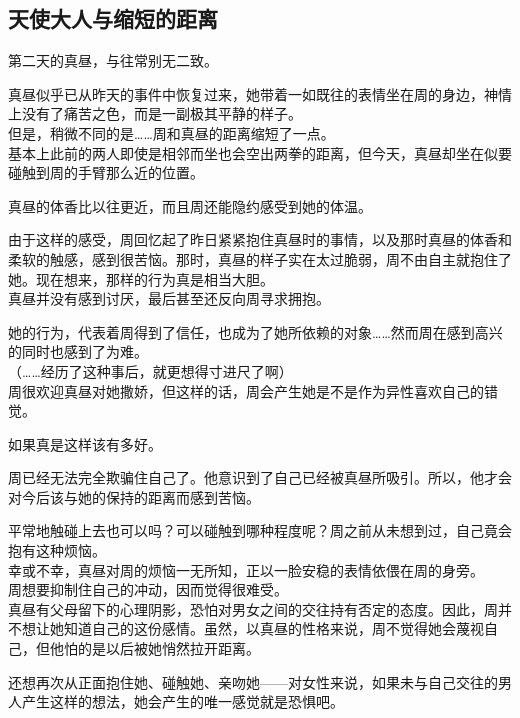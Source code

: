 \subsection{天使大人与缩短的距离}

第二天的真昼，与往常别无二致。

真昼似乎已从昨天的事件中恢复过来，她带着一如既往的表情坐在周的身边，神情上没有了痛苦之色，而是一副极其平静的样子。\\

但是，稍微不同的是……周和真昼的距离缩短了一点。\\

基本上此前的两人即使是相邻而坐也会空出两拳的距离，但今天，真昼却坐在似要碰触到周的手臂那么近的位置。

真昼的体香比以往更近，而且周还能隐约感受到她的体温。

由于这样的感受，周回忆起了昨日紧紧抱住真昼时的事情，以及那时真昼的体香和柔软的触感，感到很苦恼。那时，真昼的样子实在太过脆弱，周不由自主就抱住了她。现在想来，那样的行为真是相当大胆。\\

真昼并没有感到讨厌，最后甚至还反向周寻求拥抱。

她的行为，代表着周得到了信任，也成为了她所依赖的对象……然而周在感到高兴的同时也感到了为难。\\

（……经历了这种事后，就更想得寸进尺了啊）\\

周很欢迎真昼对她撒娇，但这样的话，周会产生她是不是作为异性喜欢自己的错觉。

如果真是这样该有多好。

周已经无法完全欺骗住自己了。他意识到了自己已经被真昼所吸引。所以，他才会对今后该与她的保持的距离而感到苦恼。

平常地触碰上去也可以吗？可以碰触到哪种程度呢？周之前从未想到过，自己竟会抱有这种烦恼。\\

幸或不幸，真昼对周的烦恼一无所知，正以一脸安稳的表情依偎在周的身旁。\\

周想要抑制住自己的冲动，因而觉得很难受。\\

真昼有父母留下的心理阴影，恐怕对男女之间的交往持有否定的态度。因此，周并不想让她知道自己的这份感情。虽然，以真昼的性格来说，周不觉得她会蔑视自己，但他怕的是以后被她悄然拉开距离。

还想再次从正面抱住她、碰触她、亲吻她——对女性来说，如果未与自己交往的男人产生这样的想法，她会产生的唯一感觉就是恐惧吧。\\

